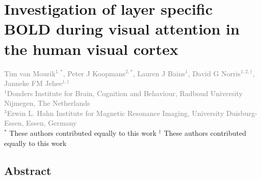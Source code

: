 
\chapter{Investigation of layer specific BOLD during visual attention in the human visual cortex}
\label{ch:attention}

\textcolor{gray}{{Tim van Mourik$^{1,*}$}, Peter J Koopmans$^{2,*}$, Lauren J Bains$^{1}$, David G Norris$^{1,2,\dagger}$, Janneke FM Jehee$^{1,\dagger}$\\
$^{1}$Donders Institute for Brain, Cognition and Behaviour, Radboud University Nijmegen, The Netherlands\\
$^{3}$Erwin L. Hahn Institute for Magnetic Resonance Imaging, University Duisburg-Essen, Essen, Germany}\\

$^*$ 		{These authors contributed equally to this work}
$^\dagger$  {These authors contributed equally to this work}


\linespread{1.5}
\newpage
\section*{Abstract}


\newpage








